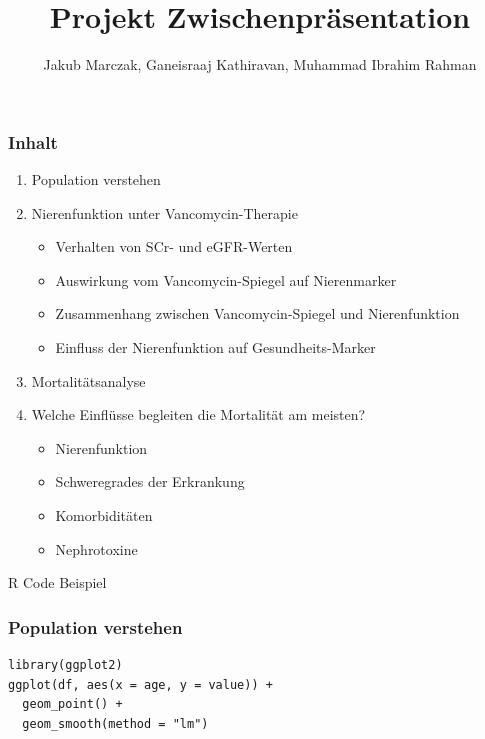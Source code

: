 \documentclass[10pt, aspectratio=169]{beamer}
\title{Projekt \MakeUppercase{\romannumeral 1}  Zwischenpräsentation}
\author[J. Marczak, G. Kathiravan, M. I. Rahman]{Jakub Marczak, Ganeisraaj Kathiravan, Muhammad Ibrahim Rahman}
\begin{document}
\begin{frame}[plain]
  \titlepage
\end{frame}

\begin{frame}
    \frametitle{Inhalt}
    \begin{enumerate}
        \item Population verstehen
        \item Nierenfunktion unter Vancomycin-Therapie
        \begin{itemize} 
        \item[$\rightarrow$] Verhalten von SCr- und eGFR-Werten
        \item[$\rightarrow$] Auswirkung vom Vancomycin-Spiegel auf Nierenmarker
        \item[$\rightarrow$] Zusammenhang zwischen Vancomycin-Spiegel und Nierenfunktion
        \item[$\rightarrow$] Einfluss der Nierenfunktion auf Gesundheits-Marker
      \end{itemize}
        \item Mortalitätsanalyse
        \item[$\rightarrow$] Welche Einflüsse begleiten die Mortalität am meisten?
        \begin{itemize}
            \item Nierenfunktion
            \item Schweregrades der Erkrankung
            \item Komorbiditäten
            \item Nephrotoxine
        \end{itemize}
    \end{enumerate}
\end{frame}

\begin{frame}[fragile]{R Code Beispiel}
    \frametitle{Population verstehen}
    \begin{lstlisting}
library(ggplot2)
ggplot(df, aes(x = age, y = value)) +
  geom_point() +
  geom_smooth(method = "lm")
    \end{lstlisting}
\end{frame}
\end{document}

